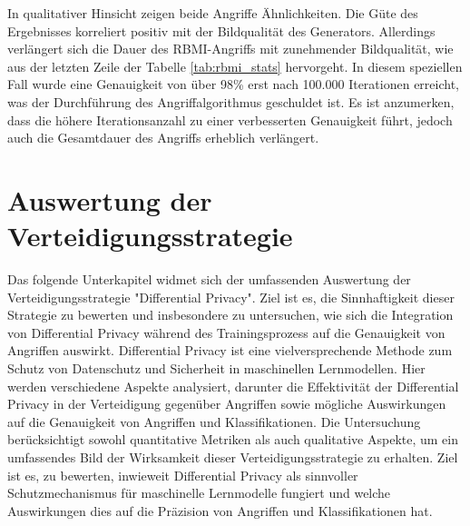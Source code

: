 In qualitativer Hinsicht zeigen beide Angriffe Ähnlichkeiten. Die Güte des Ergebnisses korreliert positiv mit der Bildqualität des Generators. Allerdings verlängert sich die Dauer des RBMI-Angriffs mit zunehmender Bildqualität, wie aus der letzten Zeile der Tabelle \ref{tab:rbmi_stats} hervorgeht. In diesem speziellen Fall wurde eine Genauigkeit von über 98\% erst nach 100.000 Iterationen erreicht, was der Durchführung des Angriffalgorithmus geschuldet ist. Es ist anzumerken, dass die höhere Iterationsanzahl zu einer verbesserten Genauigkeit führt, jedoch auch die Gesamtdauer des Angriffs erheblich verlängert.
\section{Auswertung der Verteidigungsstrategie}\label{chpt:dpnn_stats}
Das folgende Unterkapitel widmet sich der umfassenden Auswertung der Verteidigungsstrategie "Differential Privacy". Ziel ist es, die Sinnhaftigkeit dieser Strategie zu bewerten und insbesondere zu untersuchen, wie sich die Integration von Differential Privacy während des Trainingsprozess auf die Genauigkeit von Angriffen auswirkt. Differential Privacy ist eine vielversprechende Methode zum Schutz von Datenschutz und Sicherheit in maschinellen Lernmodellen. Hier werden verschiedene Aspekte analysiert, darunter die Effektivität der Differential Privacy in der Verteidigung gegenüber Angriffen sowie mögliche Auswirkungen auf die Genauigkeit von Angriffen und Klassifikationen. Die Untersuchung berücksichtigt sowohl quantitative Metriken als auch qualitative Aspekte, um ein umfassendes Bild der Wirksamkeit dieser Verteidigungsstrategie zu erhalten. Ziel ist es, zu bewerten, inwieweit Differential Privacy als sinnvoller Schutzmechanismus für maschinelle Lernmodelle fungiert und welche Auswirkungen dies auf die Präzision von Angriffen und Klassifikationen hat.


